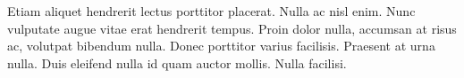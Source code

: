 \documentclass{article}
\theoremstyle{plain}
\theoremstyle{definition}
\theoremstyle{remark}
\begin{document}
Etiam aliquet hendrerit lectus porttitor placerat. Nulla ac nisl enim. Nunc vulputate augue vitae erat hendrerit tempus. Proin dolor nulla, accumsan at risus ac, volutpat bibendum nulla. Donec porttitor varius facilisis. Praesent at urna nulla. Duis eleifend nulla id quam auctor mollis. Nulla facilisi.\\
\\






\end{document}
